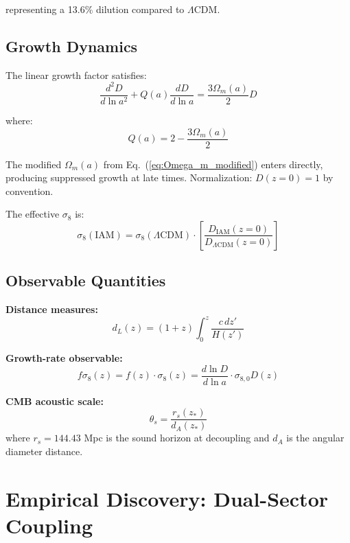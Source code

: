 \documentclass[twocolumn,superscriptaddress,prl,amsmath,amssymb]{revtex4-2}
\begin{document}
representing a 13.6\% dilution compared to $\Lambda$CDM.

\subsection{Growth Dynamics}

The linear growth factor satisfies:
\begin{equation}
\frac{d^2D}{d\ln a^2} + Q(a) \frac{dD}{d\ln a} = \frac{3\Omega_m(a)}{2}D
\label{eq:growth}
\end{equation}

where:
\begin{equation}
Q(a) = 2 - \frac{3\Omega_m(a)}{2}
\end{equation}

The modified $\Omega_m(a)$ from Eq.~(\ref{eq:Omega_m_modified}) enters directly, producing suppressed growth at late times. Normalization: $D(z=0) = 1$ by convention.

The effective $\sigma_8$ is:
\begin{equation}
\sigma_8(\text{IAM}) = \sigma_8(\Lambda\text{CDM}) \cdot \left[\frac{D_{\text{IAM}}(z=0)}{D_{\Lambda\text{CDM}}(z=0)}\right]
\end{equation}

\subsection{Observable Quantities}

\textbf{Distance measures:}
\begin{equation}
d_L(z) = (1+z) \int_0^z \frac{c\,dz'}{H(z')}
\end{equation}

\textbf{Growth-rate observable:}
\begin{equation}
f\sigma_8(z) = f(z) \cdot \sigma_8(z) = \frac{d\ln D}{d\ln a} \cdot \sigma_{8,0} D(z)
\end{equation}

\textbf{CMB acoustic scale:}
\begin{equation}
\theta_s = \frac{r_s(z_*)}{d_A(z_*)}
\end{equation}
where $r_s = 144.43$ Mpc is the sound horizon at decoupling and $d_A$ is the angular diameter distance.

\section{Empirical Discovery: Dual-Sector Coupling}
\end{document}
